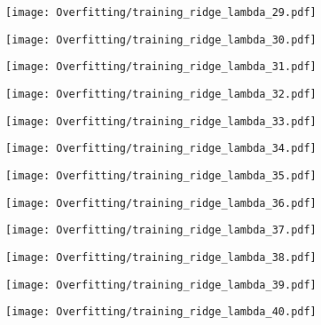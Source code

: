 \documentclass[xcolor=pdftex,dvipsnames,table]{beamer}
\begin{document}
\frame
{
	\begin{center}
		\texttt{[image: Overfitting/training\_ridge\_lambda\_29.pdf]}
	\end{center}
}

\frame
{
	\begin{center}
		\texttt{[image: Overfitting/training\_ridge\_lambda\_30.pdf]}
	\end{center}
}

\frame
{
	\begin{center}
		\texttt{[image: Overfitting/training\_ridge\_lambda\_31.pdf]}
	\end{center}
}

\frame
{
	\begin{center}
		\texttt{[image: Overfitting/training\_ridge\_lambda\_32.pdf]}
	\end{center}
}

\frame
{
	\begin{center}
		\texttt{[image: Overfitting/training\_ridge\_lambda\_33.pdf]}
	\end{center}
}

\frame
{
	\begin{center}
		\texttt{[image: Overfitting/training\_ridge\_lambda\_34.pdf]}
	\end{center}
}

\frame
{
	\begin{center}
		\texttt{[image: Overfitting/training\_ridge\_lambda\_35.pdf]}
	\end{center}
}

\frame
{
	\begin{center}
		\texttt{[image: Overfitting/training\_ridge\_lambda\_36.pdf]}
	\end{center}
}

\frame
{
	\begin{center}
		\texttt{[image: Overfitting/training\_ridge\_lambda\_37.pdf]}
	\end{center}
}

\frame
{
	\begin{center}
		\texttt{[image: Overfitting/training\_ridge\_lambda\_38.pdf]}
	\end{center}
}

\frame
{
	\begin{center}
		\texttt{[image: Overfitting/training\_ridge\_lambda\_39.pdf]}
	\end{center}
}

\frame
{
	\begin{center}
		\texttt{[image: Overfitting/training\_ridge\_lambda\_40.pdf]}
	\end{center}
}
\end{document}
